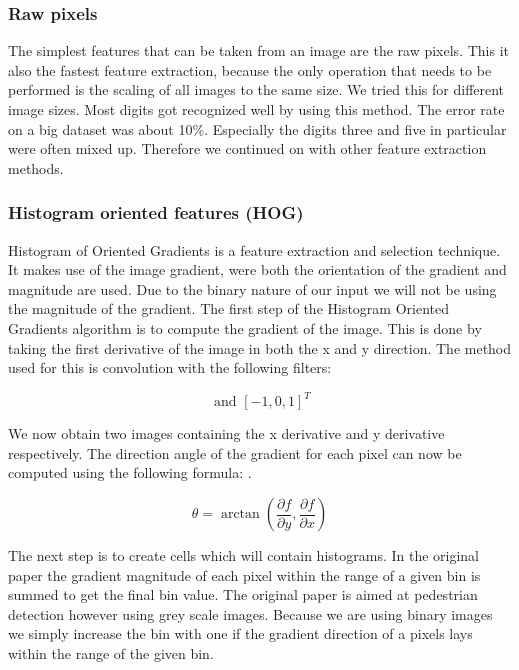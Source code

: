 \documentclass[%
        compressed,
        final,
        notitlepage,
        narroweqnarray,
        inline,
        twoside,
        ]{ieee}
\begin{document}
    \subsubsection{Raw pixels}
The simplest features that can be taken from an image are the raw pixels. This
it also the fastest feature extraction, because the only operation that needs
to be performed is the scaling of all images to the same size. We tried this for
different image sizes. Most digits got recognized well by using this method. The
error rate on a big dataset was about 10\%. Especially the digits three and five in particular were often mixed up. Therefore we continued on with other feature extraction methods.

\subsubsection{Histogram oriented features (HOG)}
Histogram of Oriented Gradients is a feature extraction and selection technique.
\cite{hog} It makes use of the image gradient, were both the orientation of the gradient and magnitude are used. Due to the binary nature of our input we will not be using the magnitude of the gradient. The first step of the Histogram Oriented Gradients algorithm is to compute the gradient of the image. This is done by taking the first derivative of the image in both the x and y direction. The method used for this is convolution with the following filters:

\begin{equation}
    [-1, 0, 1] \text{ and } [-1, 0, 1]^T
\end{equation}

We now obtain two images containing the x derivative and y derivative respectively. The direction angle of the gradient for each pixel can now be computed using the following formula: .

\begin{equation}
    \theta = \arctan\left(\frac{\partial f}{\partial y}, 
        \frac{\partial f}{\partial x}\right)
\end{equation}

The next step is to create cells which will contain histograms. In the original paper the gradient magnitude of each pixel within the range of a given bin is summed to get the final bin value. The original paper is aimed at pedestrian detection however using grey scale images. Because we are using binary images we simply increase the bin with one if the gradient direction of a pixels lays within the range of the given bin.
\end{document}

